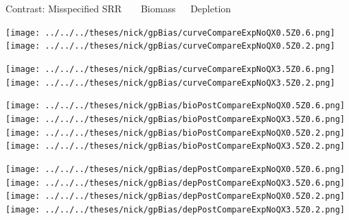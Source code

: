 \documentclass[ xcolor = pdftex, dvipsnames, table ]{beamer}
\begin{document}
%
\begin{frame}{Contrast: Misspecified SRR $~~~~~~$ Biomass $~~~~$ Depletion}
$~$
\hspace*{-1.25cm}
\begin{minipage}[h!]{0.25\textwidth}
\texttt{[image: ../../../theses/nick/gpBias/curveCompareExpNoQX0.5Z0.6.png]}\\
\texttt{[image: ../../../theses/nick/gpBias/curveCompareExpNoQX0.5Z0.2.png]}
\end{minipage}
\begin{minipage}[h!]{0.25\textwidth}
\hspace*{0.45cm}
\texttt{[image: ../../../theses/nick/gpBias/curveCompareExpNoQX3.5Z0.6.png]}\\
\hspace*{0.45cm}
\texttt{[image: ../../../theses/nick/gpBias/curveCompareExpNoQX3.5Z0.2.png]}
\end{minipage}
\begin{minipage}[h!]{0.25\textwidth}
\vspace{-0.1cm}
\hspace*{1.5cm}
\texttt{[image: ../../../theses/nick/gpBias/bioPostCompareExpNoQX0.5Z0.6.png]}\\
\hspace*{1.5cm}
\texttt{[image: ../../../theses/nick/gpBias/bioPostCompareExpNoQX3.5Z0.6.png]}\\
\hspace*{1.5cm}
\texttt{[image: ../../../theses/nick/gpBias/bioPostCompareExpNoQX0.5Z0.2.png]}\\
\hspace*{1.5cm}
\texttt{[image: ../../../theses/nick/gpBias/bioPostCompareExpNoQX3.5Z0.2.png]}
\end{minipage}
\begin{minipage}[h!]{0.25\textwidth}
\vspace{-0.1cm}
\hspace*{1.5cm}
\texttt{[image: ../../../theses/nick/gpBias/depPostCompareExpNoQX0.5Z0.6.png]}\\
\hspace*{1.5cm}
\texttt{[image: ../../../theses/nick/gpBias/depPostCompareExpNoQX3.5Z0.6.png]}\\
\hspace*{1.5cm}
\texttt{[image: ../../../theses/nick/gpBias/depPostCompareExpNoQX0.5Z0.2.png]}\\
\hspace*{1.5cm}
\texttt{[image: ../../../theses/nick/gpBias/depPostCompareExpNoQX3.5Z0.2.png]}
\end{minipage}
\end{frame}
\end{document}
